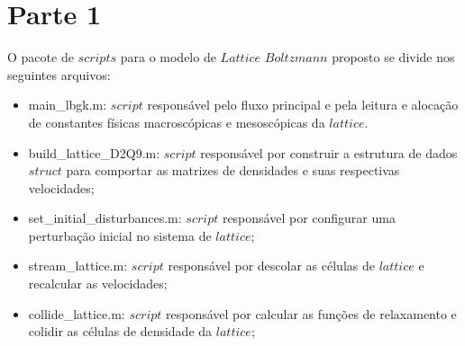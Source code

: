 \chapter{Parte 1}\label{parte_1}

O pacote de $scripts$ para o modelo de $Lattice$ $Boltzmann$ proposto se divide nos seguintes arquivos:
\begin{itemize}
	\item main\_lbgk.m: $script$ responsável pelo fluxo principal e pela leitura e alocação de constantes físicas macroscópicas e mesoscópicas da $lattice$.
	\item build\_lattice\_D2Q9.m: $script$ responsável por construir a estrutura de dados $struct$ para comportar as matrizes de densidades e suas respectivas velocidades;
	\item set\_initial\_disturbances.m: $script$ responsável por configurar uma perturbação inicial no sistema de $lattice$;
	\item stream\_lattice.m: $script$ responsável por descolar as células de $lattice$ e recalcular as velocidades;
	\item collide\_lattice.m: $script$ responsável por calcular as funções de relaxamento e colidir as células de densidade da $lattice$;
\end{itemize}

